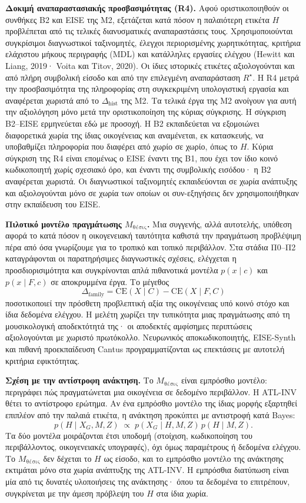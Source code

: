 \documentclass[11pt,a4paper]{article}
\begin{document}
\textbf{Δοκιμή αναπαραστασιακής προσβασιμότητας (R4).} Αφού οριστικοποιηθούν οι συνθήκες B2 και EISE της M2, εξετάζεται κατά πόσον η παλαιότερη ετικέτα $H$ προβλέπεται από τις τελικές διανυσματικές αναπαραστάσεις τους. Χρησιμοποιούνται συγκρίσιμοι διαγνωστικοί ταξινομητές, έλεγχοι περιορισμένης χωρητικότητας, κριτήρια ελάχιστου μήκους περιγραφής (MDL) και κατάλληλες εργασίες ελέγχου (Hewitt και Liang, 2019· Voita και Titov, 2020). Οι ίδιες ιστορικές ετικέτες αξιολογούνται και από πλήρη συμβολική είσοδο και από την επιλεγμένη αναπαράσταση $R^\star$. Η R4 μετρά την προσβασιμότητα της πληροφορίας στη συγκεκριμένη υπολογιστική εργασία και αναφέρεται χωριστά από το $\Delta_{\mathrm{hist}}$ της M2. Τα τελικά έργα της M2 ανοίγουν για αυτή την αξιολόγηση μόνο μετά την οριστικοποίηση της κύριας σύγκρισης. Η σύγκριση B2--EISE ερμηνεύεται εδώ με προσοχή. Η B2 εκπαιδεύεται να εξομοιώνει διαφορετικά χωρία της ίδιας οικογένειας και αναμένεται, εκ κατασκευής, να υποβαθμίζει πληροφορία που διαφέρει από χωρίο σε χωρίο, όπως το $H$. Κύρια σύγκριση της R4 είναι επομένως ο EISE έναντι της B1, που έχει τον ίδιο κοινό κωδικοποιητή χωρίς σχεσιακό όρο, και έναντι της συμβολικής εισόδου· η B2 αναφέρεται χωριστά. Οι διαγνωστικοί ταξινομητές εκπαιδεύονται σε χωρία ανάπτυξης και αξιολογούνται μόνο σε χωρία των οποίων οι συν-εξηγήσεις δεν χρησιμοποιήθηκαν στην εκπαίδευση του EISE.

\textbf{Πιλοτικό μοντέλο πραγμάτωσης $M_{\text{θέσις}}$.} Μια συγγενής, αλλά αυτοτελής, υπόθεση αφορά το κατά πόσον η οικογενειακή ταυτότητα καθιστά την πραγμάτωση προβλέψιμη πέρα από όσα γνωρίζουμε για το τροπικό και τοπικό περιβάλλον. Στα στάδια Π0--Π2 καταγράφονται οι παρατηρήσιμες διαγνωστικές σχέσεις, ελέγχεται η προσδιορισιμότητα και συγκρίνονται απλά πιθανοτικά μοντέλα $p(x\mid c)$ και $p(x\mid F,c)$ σε αποκρυμμένα έργα. Το μέγεθος
\[
\Delta_{\mathrm{family}}=\mathrm{CE}(X\mid C)-\mathrm{CE}(X\mid F,C)
\]
ποσοτικοποιεί την πρόσθετη προβλεπτική αξία της οικογένειας υπό κοινό στόχο και ίδια δεδομένα ελέγχου. Η μελέτη χωρίζει την τυπικότητα μιας πραγμάτωσης από τη μουσικολογική αποδεκτότητά της· οι αποδεκτές αμφίσημες περιπτώσεις αξιολογούνται με χωριστό πρωτόκολλο. Νευρωνικός αποκωδικοποιητής, EISE-Synth και πιθανή προεκπαίδευση Cantus προγραμματίζονται ως επεκτάσεις με αυτοτελή κριτήρια εφικτότητας.

\noindent\textbf{Σχέση με την αντίστροφη ανάκτηση.} Το $M_{\text{θέσις}}$ είναι εμπρόσθιο μοντέλο: περιγράφει πώς πραγματώνεται μια οικογένεια σε δεδομένο περιβάλλον. Η ATL-INV θέτει το αντίστροφο ερώτημα. Αν ένα εμπρόσθιο μοντέλο της ίδιας μορφής εξαρτηθεί επιπλέον από την παλαιά ετικέτα, η ανάκτηση προκύπτει με αντιστροφή κατά Bayes:
\[
p(H\mid X_G,M,Z)\;\propto\;p(X_G\mid H,M,Z)\,p(H\mid M,Z).
\]
Τα δύο μοντέλα μοιράζονται έτσι υποδομή (στοίχιση, κωδικοποίηση του περιβάλλοντος, οικογενειακές υπογραφές), όχι όμως παραμέτρους ή δεδομένα ελέγχου. Το $M_{\text{θέσις}}$ δεν δέχεται το $H$ ως είσοδο, και το εμπρόσθιο μοντέλο της ανάκτησης εκτιμάται μόνο στα χωρία ανάπτυξης της ATL-INV. Η εμπρόσθια διατύπωση είναι μία από τις δυνατές υλοποιήσεις της ανάκτησης· όπου τα δεδομένα το επιτρέπουν, συγκρίνεται με την άμεση πρόβλεψη του $H$ στα ίδια χωρία.
\end{document}
